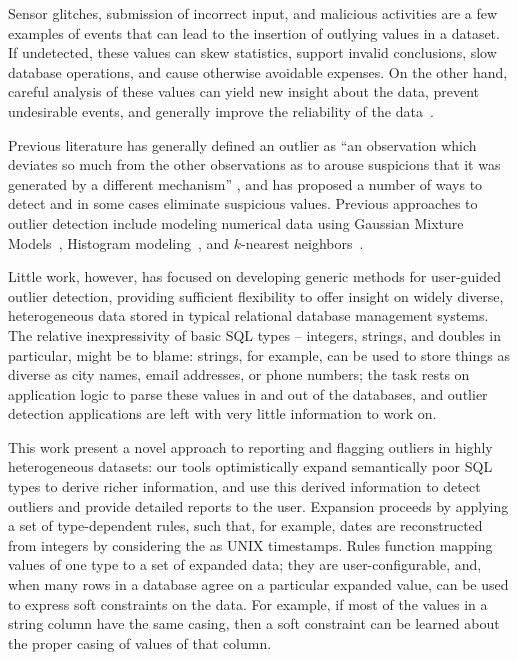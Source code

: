 
Sensor glitches, submission of incorrect input, and malicious activities are a few examples of events that can lead to the insertion of outlying values in a dataset. If undetected, these values can skew statistics, support invalid conclusions, slow database operations, and cause otherwise avoidable expenses. On the other hand, careful analysis of these values can yield new insight about the data, prevent undesirable events, and generally improve the reliability of the data~\cite{Achour2014}.

Previous literature has generally defined an outlier as ``an observation which deviates so much from the other observations as to arouse suspicions that it was generated by a different mechanism'' \cite{Hawkins1980}, and has proposed a number of ways to detect and in some cases eliminate suspicious values. Previous approaches to outlier detection include modeling numerical data using Gaussian Mixture Models~\cite{Lu2005,Roberts1994,Roberts1999}, Histogram modeling~\cite{Gebski2007,Sheng2007}, and $k$-nearest neighbors~\cite{Ramaswamy2000}.

Little work, however, has focused on developing generic methods for user-guided outlier detection, providing sufficient flexibility to offer insight on widely diverse, heterogeneous data stored in typical relational database management systems. The relative inexpressivity of basic SQL types -- integers, strings, and doubles in particular, might be to blame: strings, for example, can be used to store things as diverse as city names, email addresses, or phone numbers; the task rests on application logic to parse these values in and out of the databases, and outlier detection applications are left with very little information to work on.

This work present a novel approach to reporting and flagging outliers in highly heterogeneous datasets: our tools optimistically expand semantically poor SQL types to derive richer information, and use this derived information to detect outliers and provide detailed reports to the user. Expansion proceeds by applying a set of type-dependent rules, such that, for example, dates are reconstructed from integers by considering the as UNIX timestamps. Rules function mapping values of one type to a set of expanded data; they are user-configurable, and, when many rows in a database agree on a particular expanded value, can be used to express soft constraints on the data. For example, if most of the values in a string column have the same casing, then a soft constraint can be learned about the proper casing of values of that column.

